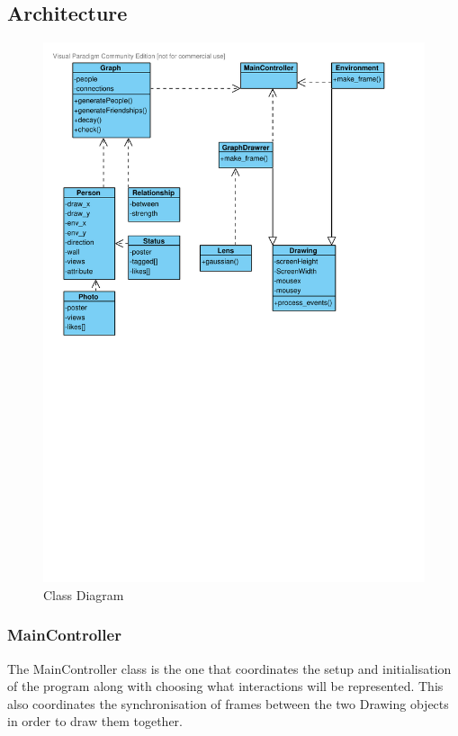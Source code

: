 \documentclass[12pt,a4paper]{article}
\begin{document}
\subsection{Architecture}
\begin{figure}[htb]
\begin{center}
\caption{Class Diagram}
\label{fig:class}
\includegraphics[width=6in]{ClassDiagram}
\end{center}
\end{figure}

\subsubsection{MainController}
The MainController class is the one that coordinates the setup and initialisation of the program along with choosing what interactions will be represented. This also coordinates the synchronisation of frames between the two Drawing objects in order to draw them together.
\end{document}
